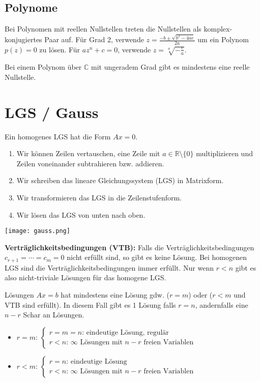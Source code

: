 \documentclass[a4paper,10pt]{article}
\begin{document}
\subsection{Polynome}

Bei Polynomen mit reellen Nullstellen treten die Nullstellen als komplex-konjugiertes Paar auf. Für Grad 2, verwende $z = \frac{-b \pm \sqrt{b^2 - 4ac}}{2a}$ um ein Polynom $p(z) = 0$ zu lösen. Für $a z^n + c = 0$, verwende $z = \sqrt[n]{-\frac{c}{a}}$.

Bei einem Polynom über $\mathbb{C}$ mit ungeradem Grad gibt es mindestens eine reelle Nullstelle.

\section{LGS / Gauss}

Ein homogenes LGS hat die Form $Ax = 0$.

\begin{enumerate}
  \item Wir können Zeilen vertauschen, eine Zeile mit $a \in \mathbb{R}\setminus \{0\}$ multiplizieren und Zeilen voneinander subtrahieren bzw. addieren.
  \item Wir schreiben das lineare Gleichungssystem (LGS) in Matrixform.
  \item Wir transformieren das LGS in die Zeilenstufenform.
  \item Wir lösen das LGS von unten nach oben.
\end{enumerate}

\begin{center}
  \texttt{[image: gauss.png]}
\end{center}

\textbf{Verträglichkeitsbedingungen (VTB):} Falls die Verträglichkeitsbedingungen $c_{r+1} = \cdots = c_m = 0$ nicht erfüllt sind, so gibt es keine Lösung. Bei homogenen LGS sind die Verträglichkeitsbedingungen immer erfüllt. Nur wenn $r < n$ gibt es also nicht-triviale Lösungen für das homogene LGS.\\

\begin{subbox}{Lösungen}
  $Ax = b$ hat mindestens eine Lösung gdw. ($r = m$) oder ($r < m$ und VTB sind erfüllt). In diesem Fall gibt es 1 Lösung falls $r = n$, andernfalls eine $n - r$ Schar an Lösungen.
  \begin{itemize}
    \item $r = m$: $\begin{cases}
      r = m = n\text{: eindeutige Lösung, regulär}\\
      r < n\text{: }\infty\text{ Lösungen mit } n - r \text{ freien Variablen}
    \end{cases}$\\
    \item $r < m$: $\begin{cases}
      r = n\text{: eindeutige Lösung}\\
      r < n\text{: }\infty\text{ Lösungen mit } n - r \text{ freien Variablen}
    \end{cases}$
  \end{itemize}
\end{subbox}
\end{document}

